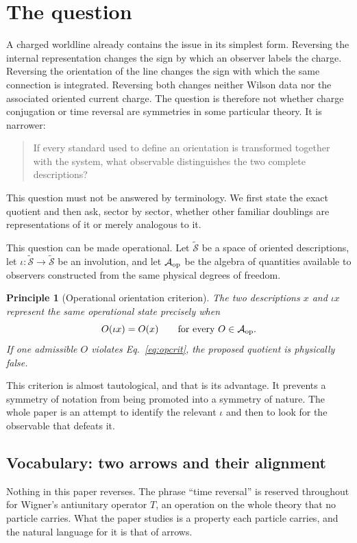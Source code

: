 \documentclass[11pt]{article}
\newtheorem{principle}[theorem]{Principle}
\theoremstyle{definition}\newtheorem{definition}[theorem]{Definition}
\theoremstyle{remark}\newtheorem{remark}[theorem]{Remark}\newtheorem{conjecture}[theorem]{Conjecture}
\begin{document}
\section{The question}
A charged worldline already contains the issue in its simplest form. Reversing the internal representation changes the sign by which an observer labels the charge. Reversing the orientation of the line changes the sign with which the same connection is integrated. Reversing both changes neither Wilson data nor the associated oriented current charge. The question is therefore not whether charge conjugation or time reversal are symmetries in some particular theory. It is narrower:
\begin{quote}
If every standard used to define an orientation is transformed together with the system, what observable distinguishes the two complete descriptions?
\end{quote}
This question must not be answered by terminology. We first state the exact quotient and then ask, sector by sector, whether other familiar doublings are representations of it or merely analogous to it.

This question can be made operational. Let $\widetilde{\mathcal S}$ be a space of oriented descriptions, let $\iota:\widetilde{\mathcal S}\to\widetilde{\mathcal S}$ be an involution, and let $\mathcal A_{\rm op}$ be the algebra of quantities available to observers constructed from the same physical degrees of freedom.

\begin{principle}[Operational orientation criterion]\label{prin:op}
The two descriptions $x$ and $\iota x$ represent the same operational state precisely when
\begin{equation}\label{eq:opcrit}
 O(\iota x)=O(x)\qquad\text{for every }O\in\mathcal A_{\rm op}.
\end{equation}
If one admissible $O$ violates Eq.~\eqref{eq:opcrit}, the proposed quotient is physically false.
\end{principle}

This criterion is almost tautological, and that is its advantage. It prevents a symmetry of notation from being promoted into a symmetry of nature. The whole paper is an attempt to identify the relevant $\iota$ and then to look for the observable that defeats it.

\subsection{Vocabulary: two arrows and their alignment}\label{subsec:arrows}
Nothing in this paper reverses. The phrase ``time reversal'' is reserved throughout for Wigner's antiunitary operator $T$, an operation on the whole theory that no particle carries. What the paper studies is a property each particle carries, and the natural language for it is that of arrows.
\end{document}
